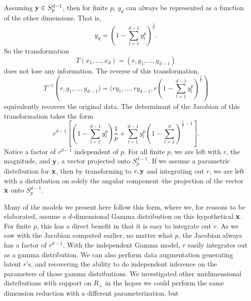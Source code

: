 Assuming ${\bf y} \in S_{p}^{d-1}$, then for finite $p$, $y_d$ can always be represented as a
  function of the other dimensions.  That is,
  \begin{equation*}
    y_d = \left(1 - \sum_{l = 1}^{d-1}y_l^p\right)^{\frac{1}{p}}.
  \end{equation*}
  So the transformation
  \begin{equation*}
    T(x_1,\ldots,x_d) = (r,y_1,\ldots,y_{d-1})
  \end{equation*}
  does not lose any information.  The reverse of this transformation,
  \begin{equation*}
    T^{-1}\left(r,y_1,\ldots,y_{d-1}) =
      (ry_1,\ldots,ry_{d-1},r\left(1 - \sum_{l = 1}^{d-1}y_l^p\right)^{\frac{1}{p}}\right)
  \end{equation*}
  equivalently recovers the original data.  The determinant of the Jacobian of this transformation
  takes the form
  \begin{equation*}
    r^{d-1}\left[\left(1 - \sum_{l = 1}^{d-1}y_l^p\right)\frac{1}{p} +
        \sum_{l = 1}^{d-1}y_l^p\left(1 - \sum_{l=1}^d\right)^{\frac{1}{p} - 1}\right].
  \end{equation*}
  Notice a factor of $r^{d-1}$ independent of $p$. For all finite $p$, we are left with $r$, the
  magnitude, and ${\bf y}$, a vector projected onto $S_{p}^{d-1}$.  If we assume a parametric
  distribution for ${\bf x}$, then by transforming to $r, {\bf y}$ and integrating out $r$, we are
  left with a distribution on solely the angular component--the projection of the vector ${\bf x}$
  onto $S_{p}^{d-1}$.

Many of the models we present here follow this form, where we, for reasons to be elaborated, assume
  a $d$-dimensional Gamma distribution on this hypothetical ${\bf x}$. For finite $p$, this has a
  direct benefit in that it is easy to integrate out $r$.  As we saw with the Jacobian computed
  earlier, no matter what $p$, the Jacobian always has a factor of $r^{d-1}$.  With the independent
  Gamma model, $r$ easily integrates out as a gamma distribution.  We can also perform data
  augmentation generating latent $r$'s, and recovering the ability to do independent inference on
  the parameters of those gamma distributions.  We investigated other unidimensional distributions
  with support on $R_+$ in the hopes we could perform the same dimension reduction with a different
  parameterization, but 

